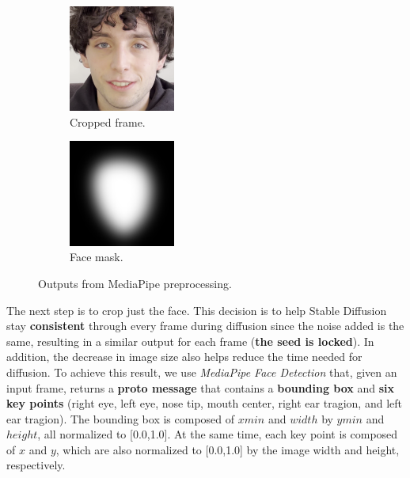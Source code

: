 \documentclass[preprint]{elsarticle}
\begin{document}
\begin{figure}[t]
	\centering
	\begin{subfigure}[b]{0.5\textwidth}
		\centering
		\includegraphics[width=3.5cm, keepaspectratio]{img/project_img/cropped.png}
		\caption{Cropped frame.}\label{fig:cropped}
	\end{subfigure}%
	\hfill
	\begin{subfigure}[b]{0.5\textwidth}
		\centering
		\includegraphics[width=3.5cm, keepaspectratio]{img/project_img/mask-blur.png}
		\caption{Face mask.}\label{fig:mask}
	\end{subfigure}
	\caption{Outputs from MediaPipe preprocessing.}\label{fig:project-mediapipe}
\end{figure}


The next step is to crop just the face. 
This decision is to help Stable Diffusion stay \textbf{consistent} through every frame during diffusion since the noise added is the same, 
resulting in a similar output for each frame (\textbf{the seed is locked}). 
In addition, the decrease in image size also helps reduce the time needed for diffusion. 
To achieve this result, we use \emph{MediaPipe Face Detection} that, given an input frame, 
returns a \textbf{proto message} that contains a \textbf{bounding box} and \textbf{six key points} (right eye, left eye, nose tip, mouth center, right ear tragion, and left ear tragion). 
The bounding box is composed of $xmin$ and $width$ by $ymin$ and $height$, all normalized to [0.0,1.0]. 
At the same time, each key point is composed of $x$ and $y$, which are also normalized to [0.0,1.0] by the image width and height, respectively. 

\FloatBarrier
\end{document}
